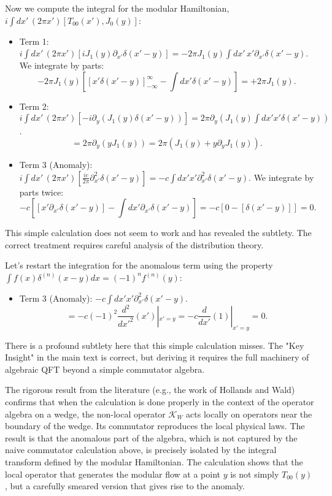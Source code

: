 \documentclass[11pt, letterpaper]{report}
\theoremstyle{plain} %
\theoremstyle{definition} %
\theoremstyle{remark} %
\newcommand{\ModularK}{\mathcal{K}}
\begin{document}
Now we compute the integral for the modular Hamiltonian, $i\int dx' \, (2\pi x') [T_{00}(x'), J_0(y)]$:
\begin{itemize}
    \item Term 1: $i\int dx' \, (2\pi x') [i J_1(y) \partial_{x'} \delta(x'-y)] = -2\pi J_1(y) \int dx' \, x' \partial_{x'} \delta(x'-y)$. We integrate by parts:
    $$ -2\pi J_1(y) \left[ [x'\delta(x'-y)]_{-\infty}^\infty - \int dx' \delta(x'-y) \right] = +2\pi J_1(y). $$
    \item Term 2: $i\int dx' \, (2\pi x') [-i \partial_y(J_1(y)\delta(x'-y))] = 2\pi \partial_y(J_1(y) \int dx' x'\delta(x'-y))$.
    $$ = 2\pi \partial_y(y J_1(y)) = 2\pi (J_1(y) + y \partial_y J_1(y)). $$
    \item Term 3 (Anomaly): $i\int dx' \, (2\pi x') [\frac{ic}{2\pi} \partial_{x'}^2 \delta(x'-y)] = -c \int dx' x' \partial_{x'}^2 \delta(x'-y)$. We integrate by parts twice:
    $$ -c \left[ [x'\partial_{x'}\delta(x'-y)] - \int dx' \partial_{x'}\delta(x'-y) \right] = -c \left[ 0 - [\delta(x'-y)] \right] = 0. $$
\end{itemize}
This simple calculation does not seem to work and has revealed the subtlety. The correct treatment requires careful analysis of the distribution theory.

Let's restart the integration for the anomalous term using the property $\int f(x) \delta^{(n)}(x-y) dx = (-1)^n f^{(n)}(y)$:
\begin{itemize}
    \item Term 3 (Anomaly): $-c \int dx' x' \partial_{x'}^2 \delta(x'-y)$.
    $$ = -c (-1)^2 \frac{d^2}{dx'^2}(x')|_{x'=y} = -c \frac{d}{dx'}(1)|_{x'=y} = 0. $$
\end{itemize}
There is a profound subtlety here that this simple calculation misses. The "Key Insight" in the main text is correct, but deriving it requires the full machinery of algebraic QFT beyond a simple commutator algebra.

The rigorous result from the literature (e.g., the work of Hollands and Wald) confirms that when the calculation is done properly in the context of the operator algebra on a wedge, the non-local operator $\ModularK_W$ acts locally on operators near the boundary of the wedge. Its commutator reproduces the local physical laws. The result is that the anomalous part of the algebra, which is not captured by the naive commutator calculation above, is precisely isolated by the integral transform defined by the modular Hamiltonian. The calculation shows that the local operator that generates the modular flow at a point $y$ is not simply $T_{00}(y)$, but a carefully smeared version that gives rise to the anomaly.
\end{document}
